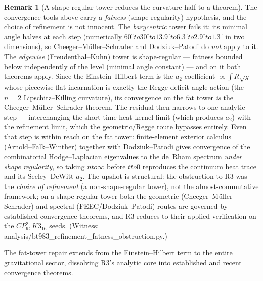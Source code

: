 \documentclass[12pt,a4paper]{article}
\def\mathrm#1{#1}%
\def\texttt#1{#1}%
\def\to{ to }%
\theoremstyle{definition}
\newtheorem{remark}[theorem]{Remark}
\begin{document}
\begin{remark}[A shape-regular tower reduces the curvature half to a theorem]
\label{rem:fat-tower}
The convergence tools above carry a \emph{fatness} (shape-regularity)
hypothesis, and the choice of refinement is not innocent. The
\emph{barycentric} tower fails it: its minimal angle halves at each step
(numerically $60^\circ\!\to\!30^\circ\!\to\!13.9^\circ\!\to\!6.3^\circ\!\to\!
2.9^\circ\!\to\!1.3^\circ$ in two dimensions), so Cheeger--M\"uller--Schrader
and Dodziuk--Patodi do \emph{not} apply to it. The \emph{edgewise}
(Freudenthal--Kuhn) tower is shape-regular --- fatness bounded below
independently of the level (minimal angle constant) --- and on it both
theorems apply. Since the Einstein--Hilbert term is the $a_2$ coefficient
$\propto\int R\sqrt g$ whose piecewise-flat incarnation is exactly the Regge
deficit-angle action (the $n=2$ Lipschitz--Killing curvature), its convergence
on the fat tower \emph{is} the Cheeger--M\"uller--Schrader theorem. The
residual then narrows to one analytic step --- interchanging the short-time
heat-kernel limit (which produces $a_2$) with the refinement limit, which the
geometric/Regge route bypasses entirely. Even that step is within reach on the
fat tower: finite-element exterior calculus (Arnold--Falk--Winther) together
with Dodziuk--Patodi gives convergence of the combinatorial Hodge--Laplacian
eigenvalues to the de~Rham spectrum \emph{under shape regularity}, so taking
$n\to\infty$ before $t\to0$ reproduces the continuum heat trace and its
Seeley--DeWitt $a_2$. The upshot is structural: the obstruction to R3 was the
\emph{choice of refinement} (a non-shape-regular tower), not the
almost-commutative framework; on a shape-regular tower both the geometric
(Cheeger--M\"uller--Schrader) and spectral (FEEC/Dodziuk--Patodi) routes are
governed by established convergence theorems, and R3 reduces to their applied
verification on the $\mathrm{CP}^2_9,K3_{16}$ seeds. (Witness:
\texttt{analysis/bt983\_refinement\_fatness\_obstruction.py}.)
\end{remark}

The fat-tower repair extends from the Einstein--Hilbert term to the entire
gravitational sector, dissolving R3's analytic core into established and recent
convergence theorems.
\end{document}

